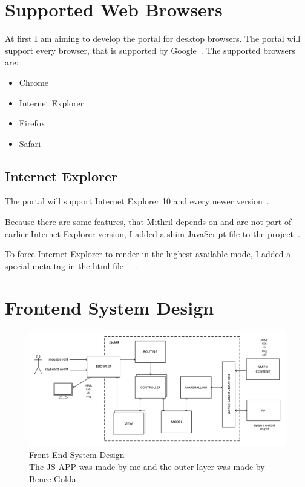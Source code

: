 \section{Supported Web Browsers}
At first I am aiming to develop the portal for desktop browsers. The portal will support every browser, that is supported by Google~\cite{google-support}.
The supported browsers are:
\begin{itemize}
	\item Chrome
	\item Internet Explorer
	\item Firefox
	\item Safari
\end{itemize}

\subsection{Internet Explorer}
The portal will support Internet Explorer 10 and every newer version~\cite{google-support-blog}.

Because there are some features, that Mithril depends on and are not part of earlier Internet Explorer version, I added a shim JavaScript file to the project~\cite{Mithril-tools}. 

To force Internet Explorer to render in the highest available mode, I added a special meta tag in the html file~\cite{IE10-microsoft}~\cite{IE10-html5-boiler} .

\section{Frontend System Design}
\label{frontend-system-design}

\begin{figure}[!htbp]
	\centering
	\includegraphics[width=0.95\textheight, angle=90]{figures/frontend_rendszerterv.pdf}
	\caption[Front End System Design]{Front End System Design\\The JS-APP was made by me and the outer layer was made by Bence Golda.}
	\label{fig:frontend-system-design}
\end{figure}


